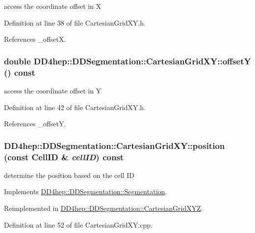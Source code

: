 access the coordinate offset in X 

Definition at line 38 of file CartesianGridXY.h.

References \_\-offsetX.\hypertarget{class_d_d4hep_1_1_d_d_segmentation_1_1_cartesian_grid_x_y_a8bbdc7e225db516f1d7f931042e20fc6}{
\subsubsection[{offsetY}]{\setlength{\rightskip}{0pt plus 5cm}double DD4hep::DDSegmentation::CartesianGridXY::offsetY () const}}
\label{class_d_d4hep_1_1_d_d_segmentation_1_1_cartesian_grid_x_y_a8bbdc7e225db516f1d7f931042e20fc6}


access the coordinate offset in Y 

Definition at line 42 of file CartesianGridXY.h.

References \_\-offsetY.\hypertarget{class_d_d4hep_1_1_d_d_segmentation_1_1_cartesian_grid_x_y_a2a7d50d0a59d37116654b0f6a691f945}{
\subsubsection[{position}]{ DD4hep::DDSegmentation::CartesianGridXY::position (const {\bf CellID} \& {\em cellID}) const}}
\label{class_d_d4hep_1_1_d_d_segmentation_1_1_cartesian_grid_x_y_a2a7d50d0a59d37116654b0f6a691f945}


determine the position based on the cell ID 

Implements \hyperlink{class_d_d4hep_1_1_d_d_segmentation_1_1_segmentation_a594fe6d78667415855858d083b64acad}{DD4hep::DDSegmentation::Segmentation}.

Reimplemented in \hyperlink{class_d_d4hep_1_1_d_d_segmentation_1_1_cartesian_grid_x_y_z_a029a72904042397250b67948270884ac}{DD4hep::DDSegmentation::CartesianGridXYZ}.

Definition at line 52 of file CartesianGridXY.cpp.

